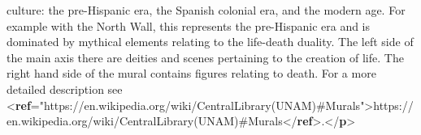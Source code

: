 \begin{shaded}
\hspace*{1em}\hspace*{1em}\hspace*{1em}\hspace*{1em}\hspace*{1em}\hspace*{1em}\hspace*{1em}\hspace*{1em} culture: the pre-Hispanic era, the Spanish colonial era, and the modern age. For example with the North\mbox{}\newline 
\hspace*{1em}\hspace*{1em}\hspace*{1em}\hspace*{1em}\hspace*{1em}\hspace*{1em}\hspace*{1em}\hspace*{1em} Wall, this represents the pre-Hispanic era and is dominated by mythical elements relating to the\mbox{}\newline 
\hspace*{1em}\hspace*{1em}\hspace*{1em}\hspace*{1em}\hspace*{1em}\hspace*{1em}\hspace*{1em}\hspace*{1em} life-death duality. The left side of the main axis there are\mbox{}\newline 
\hspace*{1em}\hspace*{1em}\hspace*{1em}\hspace*{1em}\hspace*{1em}\hspace*{1em}\hspace*{1em}\hspace*{1em} deities and scenes pertaining to the creation of life. The right hand side of the mural contains figures\mbox{}\newline 
\hspace*{1em}\hspace*{1em}\hspace*{1em}\hspace*{1em}\hspace*{1em}\hspace*{1em}\hspace*{1em}\hspace*{1em} relating to death. For a more detailed description see {<\textbf{ref}\hspace*{1em}{target}="{https://en.wikipedia.org/wiki/Central\textunderscore Library\textunderscore (UNAM)\#Murals}">}https://en.wikipedia.org/wiki/Central\textunderscore Library\textunderscore (UNAM)\#Murals{</\textbf{ref}>}.{</\textbf{p}>}\mbox{}\newline 

\end{shaded}
